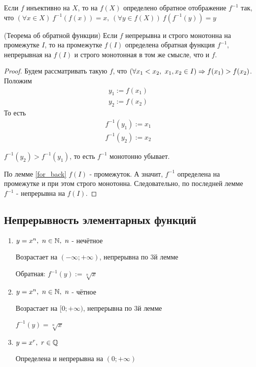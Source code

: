 \begin{definition}
	Если $f$ инъективно на $X$, то на $f(X)$ определено
	обратное отображение $f^{-1}$ так, что $(\forall x \in X)
	\ f^{-1} (f(x)) = x,\ (\forall y \in f(X))\ f(f^{-1} (y)) = y$
\end{definition}

\begin{theorem} \label{inverse_function} (Теорема об обратной функции) 
	Если $f$ непрерывна и строго монотонна на промежутке $I$,
	то на промежутке $f(I)$ определена обратная функция
	$f^{-1}$,  непрерывная на $f(I)$ и строго монотонная в
	том же смысле, что и $f$.
\end{theorem}

\begin{proof}
	Будем рассматривать такую $f$, что $(\forall x_1 < x_2,\  
	x_1, x_2 \in I) \Rightarrow f(x_1) > f(x_2)$. Положим
	\begin{align*}
		y_1 := f(x_1)
		\\
		y_2 := f(x_2)
	\end{align*}
	То есть
	\begin{align*}
		f^{-1}(y_1) := x_1
		\\
		f^{-1}(y_2) := x_2
	\end{align*}
	
	$f^{-1}(y_2) > f^{-1}(y_1)$, то есть $f^{-1}$ монотонно убывает.
	
	По лемме \ref{for_back} $f(I)$ - промежуток.
	А значит, $f^{-1}$ определена на промежутке и при
	этом строго монотонна. Следовательно, по последней лемме
	$f^{-1}$ - непрерывна на $f(I)$.
\end{proof}

\subsection{Непрерывность элементарных функций}

\begin{enumerate}
	\item $y = x^n,\ n \in \mathbb{N},\ n$ - нечётное
	
	Возрастает на $(-\infty; +\infty)$, непрерывна по 3й лемме
	
	Обратная: $f^{-1}(y) := \sqrt[n]{x}$
	
	\item $y = x^n,\ n \in \mathbb{N},\ n$ - чётное
	
	Возрастает на $[0; +\infty)$, непрерывна по 3й лемме
	
	$f^{-1}(y) = \sqrt[n]{x}$
	
	\item $y = x^r,\ r \in \mathbb{Q}$
	
	Определена и непрерывна на $(0; +\infty)$
\end{enumerate}

